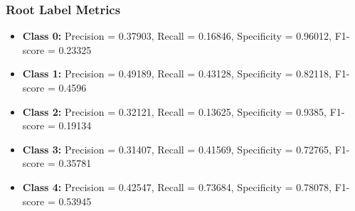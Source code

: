 \subsubsection{Root Label Metrics}
\begin{itemize}
	\item \textbf{Class 0:} Precision = 0.37903, Recall = 0.16846, Specificity = 0.96012, F1-score = 0.23325
	\item \textbf{Class 1:} Precision = 0.49189, Recall = 0.43128, Specificity = 0.82118, F1-score = 0.4596
	\item \textbf{Class 2:} Precision = 0.32121, Recall = 0.13625, Specificity = 0.9385,  F1-score = 0.19134
	\item \textbf{Class 3:} Precision = 0.31407, Recall = 0.41569, Specificity = 0.72765, F1-score = 0.35781
	\item \textbf{Class 4:} Precision = 0.42547, Recall = 0.73684, Specificity = 0.78078, F1-score = 0.53945
\end{itemize}

